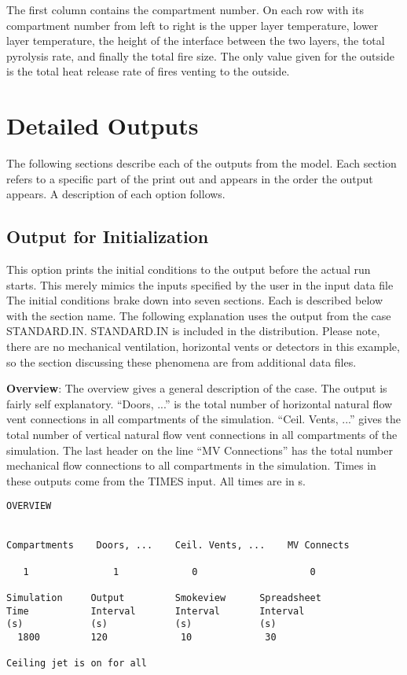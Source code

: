 The first column contains the compartment number.  On each row with its compartment number from left to right is the upper layer temperature, lower layer temperature, the height of the interface between the two layers, the total pyrolysis rate, and finally the total fire size.  The only value given for the outside is the total heat release rate of fires venting to the outside.

\section{Detailed Outputs}

The following sections describe each of the outputs from the model.  Each section refers to a specific part of the print out and appears in the order the output appears. A description of each option follows.

\subsection{Output for Initialization} 

This option prints the initial conditions to the output before the actual run starts.  This merely mimics the inputs specified by the user in the input data file  The initial conditions brake down into seven sections.  Each is described below with the section name. The following explanation uses the output from the case STANDARD.IN. STANDARD.IN is included in the distribution. Please note, there are no mechanical ventilation, horizontal vents or detectors in this example, so the section discussing these phenomena are from additional data files.

\textbf{Overview}: The overview gives a general description of the case.  The output is fairly self explanatory. ``Doors, ...'' is the total number of horizontal natural flow vent connections in all compartments of the simulation.  ``Ceil. Vents, ...'' gives the total number of vertical natural flow vent connections in all compartments of the simulation.  The last header on the line ``MV Connections'' has the total number mechanical flow connections to all compartments in the simulation. Times in these outputs come from the TIMES input. All times are in s.

\begin{lstlisting}[basicstyle=\tiny]
OVERVIEW


Compartments    Doors, ...    Ceil. Vents, ...    MV Connects

   1               1             0                    0

Simulation     Output         Smokeview      Spreadsheet
Time           Interval       Interval       Interval
(s)            (s)            (s)            (s)
  1800         120             10             30

Ceiling jet is on for all      
\end{lstlisting}

